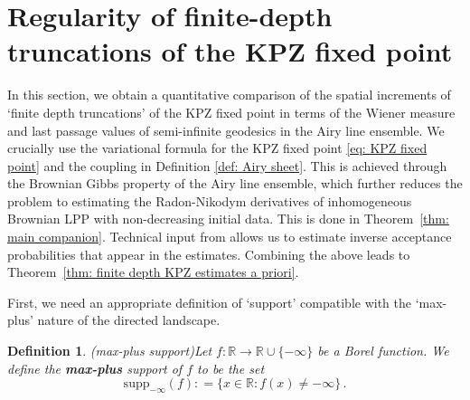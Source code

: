 \documentclass[11pt, reqno]{amsart}
\numberwithin{equation}{section}
\newcounter{dummy} \numberwithin{dummy}{section}
\newtheorem{definition}[dummy]{Definition}
\newcommand{\R}{\ensuremath{\mathbb{R}}}
\begin{document}
\section{Regularity of finite-depth truncations of the KPZ fixed point}\label{sec: finite depth truncation}

In this section, we obtain a quantitative comparison of the spatial increments of `finite depth truncations' of the KPZ fixed point in terms of the Wiener measure and last passage values of semi-infinite geodesics in the Airy line ensemble. We crucially use the variational formula for the KPZ fixed point \eqref{eq: KPZ fixed point} and the coupling in Definition \ref{def: Airy sheet}. This is achieved through the Brownian Gibbs property of the Airy line ensemble, which further reduces the problem to estimating the Radon-Nikodym derivatives of inhomogeneous Brownian LPP with non-decreasing initial data. This is done in Theorem~\ref{thm: main companion}. Technical input from \cite{dauvergne2024wienerdensitiesairyline} allows us to estimate inverse acceptance probabilities that appear in the estimates. Combining the above leads to Theorem~\ref{thm: finite depth KPZ estimates a priori}.

First, we need an appropriate definition of `support' compatible with the `max-plus' nature of the directed landscape.
\begin{definition}(max-plus support)\label{def: max support}
    Let $f:\R\to \R\cup \{-\infty\}$ be a Borel function. We define the \textbf{max-plus} support of $f$ to be the set
    \begin{equation*}
    \mathrm{supp}_{-\infty}(f) : = \{x\in \R: f(x)\neq -\infty\}\,.
    \end{equation*}
\end{definition}
\end{document}
